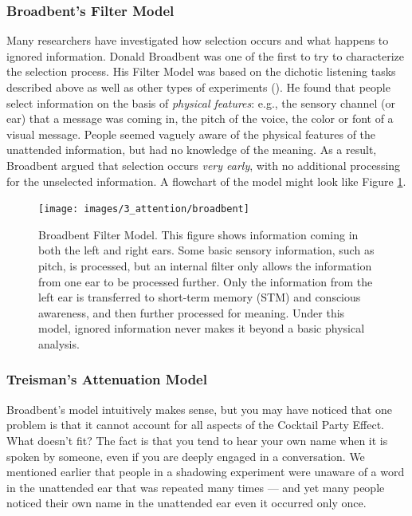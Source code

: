 \documentclass[
]{krantz}
\begin{document}
\subsubsection*{Broadbent's Filter Model}\label{broadbents-filter-model}


Many researchers have investigated how selection occurs and what happens to ignored information. Donald Broadbent was one of the first to try to characterize the selection process. His Filter Model was based on the dichotic listening tasks described above as well as other types of experiments (). He found that people select information on the basis of \emph{physical features}: e.g., the sensory channel (or ear) that a message was coming in, the pitch of the voice, the color or font of a visual message. People seemed vaguely aware of the physical features of the unattended information, but had no knowledge of the meaning. As a result, Broadbent argued that selection occurs \emph{very early}, with no additional processing for the unselected information. A flowchart of the model might look like Figure \ref{fig:broadbent}.

\begin{figure}

{\centering \texttt{[image: images/3\_attention/broadbent]} 

}

\caption{Broadbent Filter Model. This figure shows information coming in both the left and right ears. Some basic sensory information, such as pitch, is processed, but an internal filter only allows the information from one ear to be processed further. Only the information from the left ear is transferred to short-term memory (STM) and conscious awareness, and then further processed for meaning. Under this model, ignored information never makes it beyond a basic physical analysis.}\label{fig:broadbent}
\end{figure}

\subsubsection*{Treisman's Attenuation Model}\label{treismans-attenuation-model}


Broadbent's model intuitively makes sense, but you may have noticed that one problem is that it cannot account for all aspects of the Cocktail Party Effect. What doesn't fit? The fact is that you tend to hear your own name when it is spoken by someone, even if you are deeply engaged in a conversation. We mentioned earlier that people in a shadowing experiment were unaware of a word in the unattended ear that was repeated many times --- and yet many people noticed their own name in the unattended ear even it occurred only once.
\end{document}
